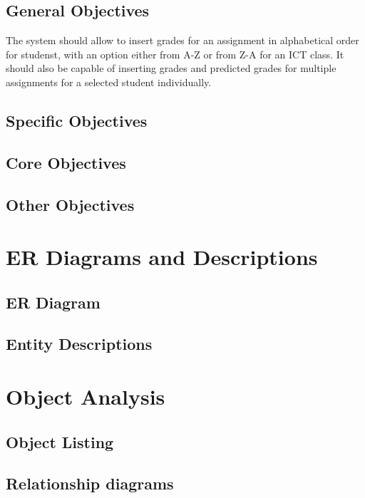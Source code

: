 \subsection{General Objectives}

The system should allow to insert grades for an assignment in alphabetical order for studenst, with an option either from A-Z or from Z-A for an ICT class. It should also be capable of inserting grades and predicted grades for multiple assignments for a selected student individually.

\subsection{Specific Objectives}

\subsection{Core Objectives}

\subsection{Other Objectives}

\section{ER Diagrams and Descriptions}

\subsection{ER Diagram}

\subsection{Entity Descriptions}

\section{Object Analysis}

\subsection{Object Listing}

\subsection{Relationship diagrams}

